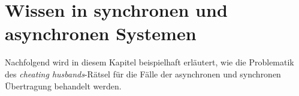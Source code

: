 \section{Wissen in synchronen und asynchronen Systemen}
\label{sync_vs_async}
Nachfolgend wird in diesem Kapitel beispielhaft erläutert, wie die Problematik des \textit{cheating husbands}-Rätsel für die Fälle der asynchronen und synchronen Übertragung behandelt werden.

